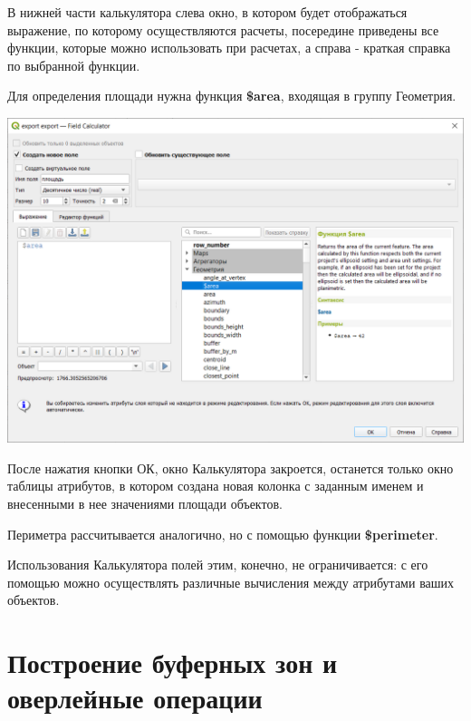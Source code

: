 \documentclass[
]{book}
\begin{document}
В нижней части калькулятора слева окно, в котором будет отображаться выражение, по которому осуществляются расчеты, посередине приведены все функции, которые можно использовать при расчетах, а справа - краткая справка по выбранной функции.

Для определения площади нужна функция \textbf{\$area}, входящая в группу Геометрия.

\includegraphics{figures/43.png}

После нажатия кнопки ОК, окно Калькулятора закроется, останется только окно таблицы атрибутов, в котором создана новая колонка с заданным именем и внесенными в нее значениями площади объектов.

Периметра рассчитывается аналогично, но с помощью функции \textbf{\$perimeter}.

Использования Калькулятора полей этим, конечно, не ограничивается: с его помощью можно осуществлять различные вычисления между атрибутами ваших объектов.

\hypertarget{ux43fux43eux441ux442ux440ux43eux435ux43dux438ux435-ux431ux443ux444ux435ux440ux43dux44bux445-ux437ux43eux43d-ux438-ux43eux432ux435ux440ux43bux435ux439ux43dux44bux435-ux43eux43fux435ux440ux430ux446ux438ux438}{%
\chapter{Построение буферных зон и оверлейные операции}\label{ux43fux43eux441ux442ux440ux43eux435ux43dux438ux435-ux431ux443ux444ux435ux440ux43dux44bux445-ux437ux43eux43d-ux438-ux43eux432ux435ux440ux43bux435ux439ux43dux44bux435-ux43eux43fux435ux440ux430ux446ux438ux438}}
\end{document}
